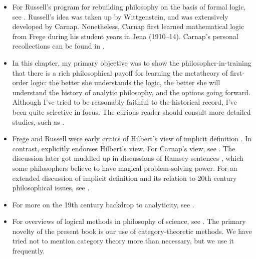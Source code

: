 \begin{itemize}
\item For Russell's program for rebuilding philosophy on the basis of
  formal logic, see \citep{russell-math,russell-le}.  Russell's idea
  was taken up by Wittgenstein, and was extensively developed by
  Carnap.  Nonetheless, Carnap first learned mathematical logic from
  Frege during his student years in Jena (1910--14). Carnap's personal
  recollections can be found in \citep{carnap-schilpp}.
\item In this chapter, my primary objective was to show the
  philosopher-in-training that there is a rich philosophical payoff
  for learning the metatheory of first-order logic: the better she
  understands the logic, the better she will understand the history of
  analytic philosophy, and the options going forward.  Although I've
  tried to be reasonably faithful to the historical record, I've been
  quite selective in focus.  The curious reader should consult more
  detailed studies, such as \cite{coffa,friedman1999,hylton,soames}.
\item Frege and Russell were early critics of Hilbert's view of
  implicit definition \cite[see e.g.][]{frege-hilbert}.  In contrast,
  \cite[I.7]{schlick} explicitly endorses Hilbert's view.  For
  Carnap's view, see \cite{park2012}.  The discussion later got
  muddled up in discussions of Ramsey sentences \cite[see
  e.g.][]{winnie-id,lewis-terms}, which some philosophers believe to
  have magical problem-solving power.  For an extended discussion of
  implicit definition and its relation to 20th century philosophical
  issues, see \cite{benmen}.
\item For more on the 19th century backdrop to analyticity, see
  \cite{coffa-geom}.
\item For overviews of logical methods in philosophy of science, see
  \cite{benthem-new,winnie,fraassen-new,leitgeb}.  The primary novelty
  of the present book is our use of category-theoretic methods.  We
  have tried not to mention category theory more than necessary, but
  we use it frequently.
  \end{itemize}


